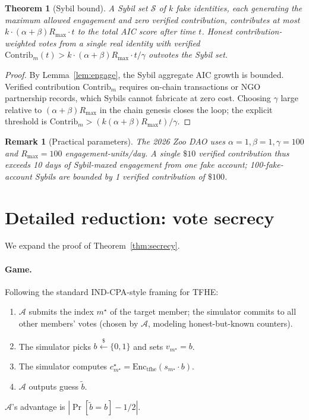 \documentclass[11pt]{article}
\newtheorem{theorem}{Theorem}
\newtheorem{remark}{Remark}
\begin{document}
\begin{theorem}[Sybil bound]
\label{thm:sybil}
A Sybil set $\mathcal{S}$ of $k$ fake identities, each generating
the maximum allowed engagement and zero verified contribution,
contributes at most $k \cdot (\alpha + \beta) R_{\max} \cdot t$
to the total AIC score after time $t$. Honest contribution-weighted
votes from a single real identity with verified
$\mathrm{Contrib}_m(t) > k \cdot (\alpha + \beta) R_{\max} \cdot t /
\gamma$ outvotes the Sybil set.
\end{theorem}

\begin{proof}
By Lemma~\ref{lem:engage}, the Sybil aggregate AIC growth is
bounded. Verified contribution $\mathrm{Contrib}_m$ requires
on-chain transactions or NGO partnership records, which Sybils
cannot fabricate at zero cost. Choosing
$\gamma$ large relative to $(\alpha + \beta) R_{\max}$ in the
chain genesis closes the loop; the explicit threshold is
$\mathrm{Contrib}_m > (k (\alpha + \beta) R_{\max} t)/\gamma$.
\end{proof}

\begin{remark}[Practical parameters]
The 2026 Zoo DAO uses $\alpha = 1, \beta = 1, \gamma = 100$ and
$R_{\max} = 100$ engagement-units/day. A single $\$10$ verified
contribution thus exceeds 10 days of Sybil-maxed engagement from
one fake account; 100-fake-account Sybils are bounded by 1 verified
contribution of $\$100$.
\end{remark}

\section{Detailed reduction: vote secrecy}
\label{sec:detail-secrecy}

We expand the proof of Theorem~\ref{thm:secrecy}.

\paragraph{Game.}
Following the standard IND-CPA-style framing for TFHE:
\begin{enumerate}[nosep]
  \item $\mathcal{A}$ submits the index $m^\star$ of the target
        member; the simulator commits to all other members'
        votes (chosen by $\mathcal{A}$, modeling honest-but-known
        counters).
  \item The simulator picks $b \overset{\$}{\leftarrow} \{0,1\}$
        and sets $v_{m^\star} = b$.
  \item The simulator computes
        $c_{m^\star}^\star = \mathrm{Enc}_{\mathrm{tfhe}}(s_{m^\star} \cdot b)$.
  \item $\mathcal{A}$ outputs guess $\tilde{b}$.
\end{enumerate}
$\mathcal{A}$'s advantage is $|\Pr[\tilde{b} = b] - 1/2|$.
\end{document}
